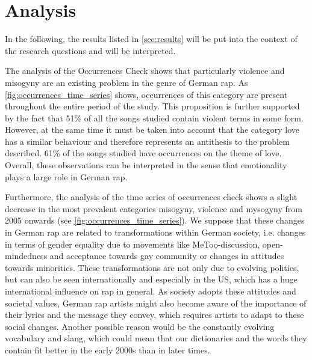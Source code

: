 \section{Analysis}\label{sec:analysis}

In the following, the results listed in \autoref{sec:results} will be put into the context of the research questions and will be interpreted. 

The analysis of the Occurrences Check shows that particularly violence and misogyny are an existing problem in the genre of German rap. As \autoref{fig:occurrences_time_series} shows, occurrences of this category are present throughout the entire period of the study. This proposition is further supported by the fact that 51\% of all the songs studied contain violent terms in some form. However, at the same time it must be taken into account that the category love has a similar behaviour and therefore represents an antithesis to the problem described. 61\% of the songs studied have occurrences on the theme of love. Overall, these observations can be interpreted in the sense that emotionality plays a large role in German rap.

Furthermore, the analysis of the time series of occurrences check shows a slight decrease in the most prevalent categories misogyny, violence and mysogyny from 2005 onwards (see \autoref{fig:occurrences_time_series}). We suppose that these changes in German rap are related to transformations within German society, i.e. changes in terms of gender equality due to movements like MeToo-discussion, open-mindedness and acceptance towards gay community or changes in attitudes towards minorities. These transformations are not only due to evolving politics, but can also be seen internationally and especially in the US, which has a huge international influence on rap in general. As society adopts these attitudes and societal values, German rap artists might also become aware of the importance of their lyrics and the message they convey, which requires artists to adapt to these social changes. Another possible reason would be the constantly evolving vocabulary and slang, which could mean that our dictionaries and the words they contain fit better in the early 2000s than in later times.

